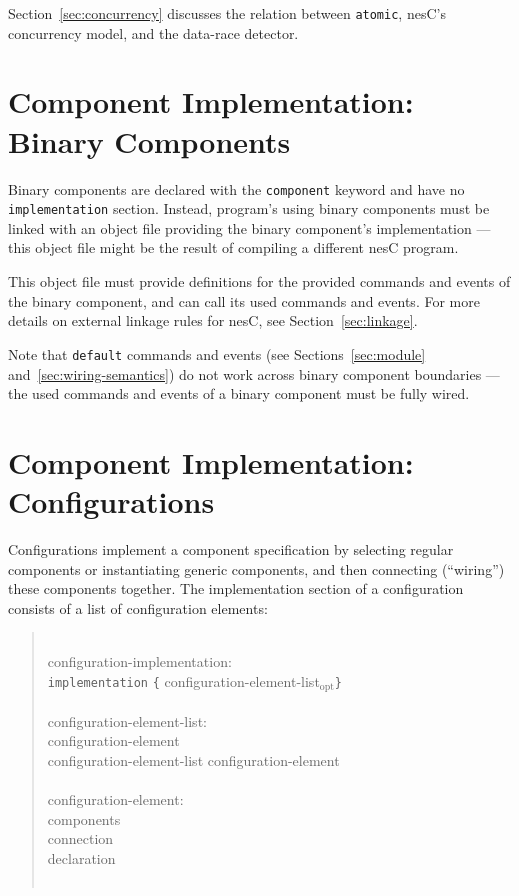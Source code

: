 \documentclass[11pt,letterpaper]{article}
\newcommand{\kw}[1]{{\tt #1}}
\newcommand{\nesc}{nesC\xspace}
\newcommand{\opt}{$_{\mbox{opt}}$\xspace}
\newcommand{\grammarshift}{\vspace*{-.7cm}}
\newcommand{\grammarindent}{\hspace*{2cm}\= \\ \kill}
\begin{document}
Section~\ref{sec:concurrency} discusses the relation between \kw{atomic}, 
\nesc's concurrency model, and the data-race detector.

\section{Component Implementation: Binary Components}
\label{sec:binary}

Binary components are declared with the \kw{component} keyword and
have no \kw{implementation} section. Instead, program's using binary
components must be linked with an object file providing the binary
component's implementation --- this object file might be the result
of compiling a different \nesc program.

This object file must provide definitions for the provided commands
and events of the binary component, and can call its used commands
and events. For more details on external linkage rules for \nesc,
see Section~\ref{sec:linkage}.

Note that \kw{default} commands and events (see Sections~\ref{sec:module}
and~\ref{sec:wiring-semantics}) do not work across binary component
boundaries --- the used commands and events of a binary component must
be fully wired.

\section{Component Implementation: Configurations}
\label{sec:configuration}

Configurations implement a component specification by selecting regular
components or instantiating generic components, and then connecting
(``wiring'') these components together. The implementation section of a
configuration consists of a list of configuration elements:
\begin{quote} \grammarshift \em \begin{tabbing}
\grammarindent
configuration-implementation:\\
\>	\kw{implementation} \kw{\{} configuration-element-list\opt \kw{\}}\\
\\
configuration-element-list:\\
\>	configuration-element\\
\>	configuration-element-list configuration-element\\
\\
configuration-element:\\
\>	components\\
\>	connection\\
\>	declaration\\
\\
\end{tabbing} \end{quote}
\end{document}
